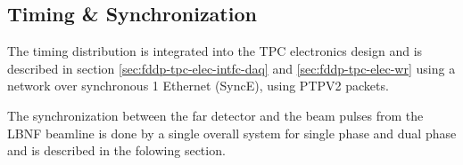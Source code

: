 \subsection{Timing \& Synchronization}
\label{sec:fd-daq-timing}


The timing distribution is integrated into the TPC electronics design
and is described in section \ref{sec:fddp-tpc-elec-intfc-daq} and
\ref{sec:fddp-tpc-elec-wr} using a  network over
synchronous \SI{1}{\Gbps} Ethernet (SyncE), using PTPV2 packets.

The synchronization between the far detector and the beam pulses from
the LBNF beamline is done by a single overall system for single phase
and dual phase and is described in the folowing section.



